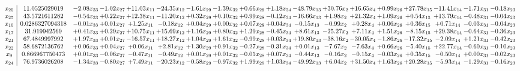 \documentclass[9pt]{article}
\begin{document}
 \[\begin{array}{c| c c@{\hskip 2pt} c@{\hskip 2pt} c@{\hskip 2pt} c@{\hskip 2pt} c@{\hskip 2pt} c@{\hskip 2pt} c@{\hskip 2pt} c@{\hskip 2pt} c@{\hskip 2pt} c@{\hskip 2pt} c@{\hskip 2pt} c@{\hskip 2pt} c@{\hskip 2pt} c@{\hskip 2pt} c@{\hskip 2pt} c@{\hskip 2pt} }
 x_{20}   &  11.0525029019 & -2.08 x_{33} & -1.02 x_{27} & + 11.03 x_{11} & -24.35 x_{12} & -1.61 x_{29} & -1.39 x_{32} & +  0.66 x_{28} & +  1.18 x_{34} & -48.79 x_{13} & + 30.76 x_{2} & + 16.65 x_{4} & +  0.99 x_{26} & + 27.78 x_{15} & -11.41 x_{14} & -1.71 x_{31} & -0.18 x_{23}\\
 x_{25}   &  43.5721611282 & -0.54 x_{33} & +  0.22 x_{27} & + 12.38 x_{11} & -11.20 x_{12} & +  0.32 x_{29} & +  0.10 x_{32} & +  0.99 x_{28} & -0.12 x_{34} & -16.66 x_{13} & +  1.98 x_{2} & + 21.32 x_{4} & +  1.09 x_{26} & +  0.54 x_{15} & + 13.79 x_{14} & -0.48 x_{31} & -0.04 x_{23}\\
 x_{10}   &  0.0286327094318 & -0.01 x_{33} & +  0.01 x_{27} & +  1.25 x_{11} & -0.18 x_{12} & +  0.04 x_{29} & +  0.00 x_{32} & +  0.07 x_{28} & +  0.04 x_{34} & -0.15 x_{13} & -0.99 x_{2} & +  0.28 x_{4} & +  0.06 x_{26} & +  0.36 x_{15} & +  0.71 x_{14} & -0.03 x_{31} & -0.04 x_{23}\\
 x_{17}   &  31.919942569 & +  0.41 x_{33} & +  0.29 x_{27} & + 10.75 x_{11} & + 15.69 x_{12} & +  1.16 x_{29} & +  0.80 x_{32} & +  1.29 x_{28} & -0.45 x_{34} & +  8.61 x_{13} & -25.27 x_{2} & +  7.11 x_{4} & +  1.51 x_{26} & -8.15 x_{15} & + 29.38 x_{14} & -0.64 x_{31} & -0.36 x_{23}\\
 x_{21}   &  67.4849997992 & +  1.97 x_{33} & +  0.01 x_{27} & -16.57 x_{11} & + 18.27 x_{12} & +  1.04 x_{29} & +  1.61 x_{32} & -0.99 x_{28} & +  0.03 x_{34} & + 19.80 x_{13} & -38.16 x_{2} & -30.05 x_{4} & -1.86 x_{26} & -17.32 x_{15} & -2.09 x_{14} & +  1.21 x_{31} & -0.42 x_{23}\\
 x_{22}   &  58.6872136762 & +  0.06 x_{33} & +  0.04 x_{27} & +  0.06 x_{11} & +  2.81 x_{12} & +  1.30 x_{29} & +  0.91 x_{32} & -0.27 x_{28} & -0.31 x_{34} & +  0.01 x_{13} & -7.67 x_{2} & -7.63 x_{4} & +  0.66 x_{26} & -5.40 x_{15} & + 22.77 x_{14} & -0.60 x_{31} & -0.10 x_{23}\\
 x_{9}   &  0.866967750473 & +  0.01 x_{33} & -0.06 x_{27} & -0.47 x_{11} & -0.49 x_{12} & +  0.01 x_{29} & +  0.01 x_{32} & -0.05 x_{28} & +  0.07 x_{34} & -0.44 x_{13} & -0.16 x_{2} & -0.15 x_{4} & -0.03 x_{26} & +  0.35 x_{15} & -0.50 x_{14} & +  0.00 x_{31} & -0.02 x_{23}\\
 x_{24}   &  76.9736026208 & -1.34 x_{33} & -0.80 x_{27} & +  7.49 x_{11} & -20.23 x_{12} & -0.58 x_{29} & -0.97 x_{32} & +  1.99 x_{28} & +  1.03 x_{34} & -49.92 x_{13} & +  6.04 x_{2} & + 31.50 x_{4} & +  1.63 x_{26} & + 20.28 x_{15} & -5.93 x_{14} & -1.29 x_{31} & -0.16 x_{23}\\

\end{array}\]
\end{document}
